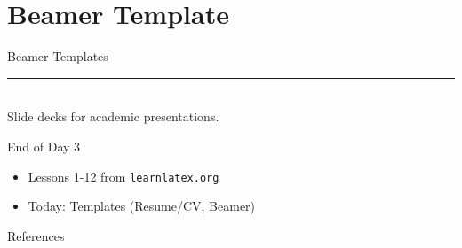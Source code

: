 \documentclass{beamer}
\begin{document}
{  

  \section{Beamer Template}

  \begin{frame}[plain]
    \vfill
    \centering
    \begin{beamercolorbox}[sep=8pt,center,shadow=true,rounded=true]{Beamer Templates}
      \insertsectionhead\par%
      \color{davisblue}\noindent\rule{10cm}{1pt} \\
      \footnotesize{Slide decks for academic presentations.}
    \end{beamercolorbox}
    \vfill
  \end{frame}

\begin{frame}{End of Day 3}
  \begin{itemize}
    \item Lessons 1-12 from \texttt{learnlatex.org}
    \item Today: Templates (Resume/CV, Beamer)
  \end{itemize}
\end{frame}

\begin{frame}{References}
  
  
\end{frame}

} %
\end{document}
